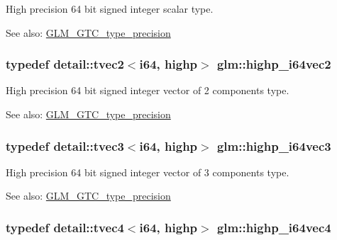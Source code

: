 High precision 64 bit signed integer scalar type. \begin{Desc}
\item[See also:]\hyperlink{group__gtc__type__precision}{GLM\_\-GTC\_\-type\_\-precision} \end{Desc}
\hypertarget{group__gtc__type__precision_gbfe3aa6fa4003a47577beb9678ab2661}{
\subsubsection[highp\_\-i64vec2]{\setlength{\rightskip}{0pt plus 5cm}typedef detail::tvec2$<$i64, highp$>$ {\bf glm::highp\_\-i64vec2}}}
\label{group__gtc__type__precision_gbfe3aa6fa4003a47577beb9678ab2661}


High precision 64 bit signed integer vector of 2 components type. \begin{Desc}
\item[See also:]\hyperlink{group__gtc__type__precision}{GLM\_\-GTC\_\-type\_\-precision} \end{Desc}
\hypertarget{group__gtc__type__precision_g4030f8ad15da56f5e427aa457d39e888}{
\subsubsection[highp\_\-i64vec3]{\setlength{\rightskip}{0pt plus 5cm}typedef detail::tvec3$<$i64, highp$>$ {\bf glm::highp\_\-i64vec3}}}
\label{group__gtc__type__precision_g4030f8ad15da56f5e427aa457d39e888}


High precision 64 bit signed integer vector of 3 components type. \begin{Desc}
\item[See also:]\hyperlink{group__gtc__type__precision}{GLM\_\-GTC\_\-type\_\-precision} \end{Desc}
\hypertarget{group__gtc__type__precision_g0ea279cd954fbb71a1db62e897d4d7f5}{
\subsubsection[highp\_\-i64vec4]{\setlength{\rightskip}{0pt plus 5cm}typedef detail::tvec4$<$i64, highp$>$ {\bf glm::highp\_\-i64vec4}}}
\label{group__gtc__type__precision_g0ea279cd954fbb71a1db62e897d4d7f5}


